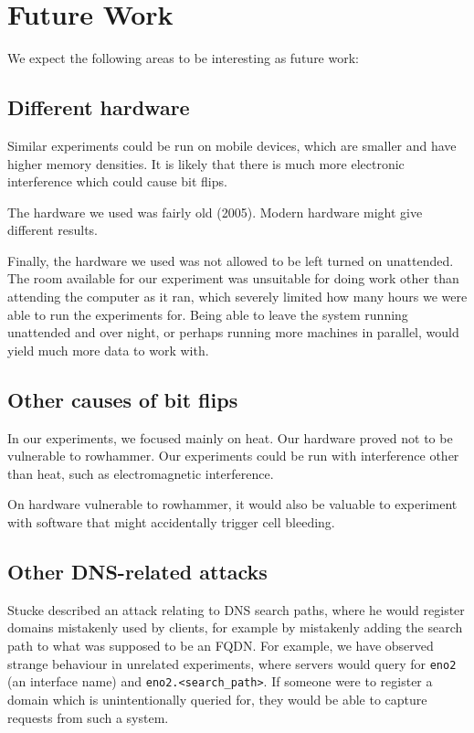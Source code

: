 \documentclass[conference]{IEEEtran}
\begin{document}
\section{Future Work}\label{sec:futwork}

We expect the following areas to be interesting as future work:

\subsection{Different hardware}

Similar experiments could be run on mobile devices, which are smaller and have
higher memory densities. It is likely that there is much more electronic
interference which could cause bit flips.

The hardware we used was fairly old (2005). Modern hardware might give
different results.

Finally, the hardware we used was not allowed to be left turned on unattended.
The room available for our experiment was unsuitable for doing work other than
attending the computer as it ran, which severely limited how many hours we were
able to run the experiments for. Being able to leave the system running
unattended and over night, or perhaps running more machines in parallel, would
yield much more data to work with.


\subsection{Other causes of bit flips}

In our experiments, we focused mainly on heat. Our hardware proved not to be
vulnerable to rowhammer. Our experiments could be run with interference other
than heat, such as electromagnetic interference.

On hardware vulnerable to rowhammer, it would also be valuable to experiment
with software that might accidentally trigger cell bleeding.

\subsection{Other DNS-related attacks}

Stucke\cite{suffixpath} described an attack relating to DNS search paths, where
he would register domains mistakenly used by clients, for example by mistakenly
adding the search path to what was supposed to be an FQDN. For example, we have
observed strange behaviour in unrelated experiments, where servers would query
for \texttt{eno2} (an interface name) and \texttt{eno2.<search\_path>}. If
someone were to register a domain which is unintentionally queried for, they
would be able to capture requests from such a system.


\printbibliography


\end{document}
